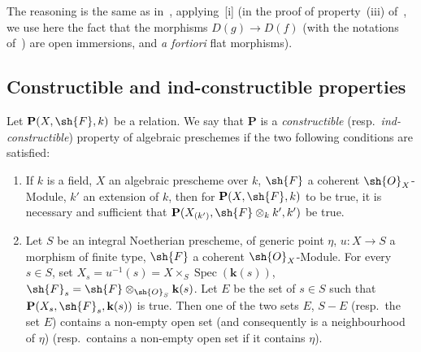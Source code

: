 The reasoning is the same as in~, applying~[i] (in the proof of property~(iii) of~, we use here the fact that the morphisms $D(g)\to D(f)$ (with the notations of~) are open immersions, and \emph{a fortiori} flat morphisms).

\subsection{Constructible and ind-constructible properties}
\label{subsection:IV.9.2}
\label{IV.9.2}

\begin{definition}[9.2.1]
\label{IV.9.2.1}
Let $\mathbf{P}(X,\sh{F},k)$ be a relation.
We say that $\mathbf{P}$ is a \emph{constructible} (resp.\ \emph{ind-constructible}) property of algebraic preschemes if the two following conditions are satisfied:
\begin{enumerate}[label=(\roman*)]
  \item If $k$ is a field, $X$ an algebraic prescheme over $k$, $\sh{F}$ a coherent $\sh{O}_X$-Module, $k'$ an extension of $k$, then for $\mathbf{P}(X,\sh{F},k)$ to be true, it is necessary and sufficient that $\mathbf{P}(X_{(k')},\sh{F}\otimes_k k',k')$ be true.
  \item Let $S$ be an integral Noetherian prescheme, of generic point $\eta$, $u:X\to S$ a morphism of finite type, $\sh{F}$ a coherent $\sh{O}_X$-Module.
For every $s\in S$, set $X_s=u^{-1}(s)=X\times_S\operatorname{Spec}(\mathbf{k}(s))$, $\sh{F}_s=\sh{F}\otimes_{\sh{O}_S}\mathbf{k}(s)$.
Let $E$ be the set of $s\in S$ such that $\mathbf{P}(X_s,\sh{F}_s,\mathbf{k}(s))$ is true.
Then one of the two sets $E$, $S-E$ (resp.\ the set $E$) contains a non-empty open set (and consequently is a neighbourhood of $\eta$) (resp.\ contains a non-empty open set if it contains $\eta$).
\end{enumerate}
\end{definition}


